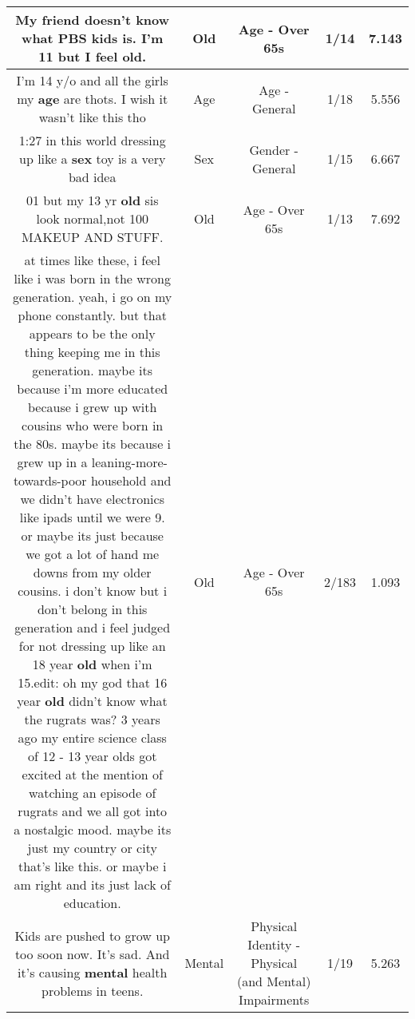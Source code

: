 \documentclass[11pt]{article}
\newlength\mylength
\begin{document}
\begin{center}
\begin{longtable}{|C{.65\mylength}|C{.30\mylength}|C{.12\mylength}|C{.12\mylength}|C{.12\mylength}|}
  \small My friend doesn't know what PBS kids is. I'm 11 but I feel \textbf{old}.\normalsize   & Old & Age - Over 65s & 1/14 & 7.143 \\  \hline
  \small I'm 14 y/o and all the girls my \textbf{age} are thots. I wish it wasn't like this tho\normalsize   & Age & Age - General & 1/18 & 5.556 \\  \hline
  \small 1:27 in this world dressing up like a \textbf{sex} toy is a very bad idea\normalsize   & Sex & Gender - General & 1/15 & 6.667 \\  \hline
  \small 01 but my 13 yr \textbf{old} sis look normal,not 100 MAKEUP AND STUFF.\normalsize   & Old & Age - Over 65s & 1/13 & 7.692 \\  \hline
  \small at times like these, i feel like i was born in the wrong generation. yeah, i go on my phone constantly. but that appears to be the only thing keeping me in this generation. maybe its because i'm more educated because i grew up with cousins who were born in the 80s. maybe its because i grew up in a leaning-more-towards-poor household and we didn't have electronics like ipads until we were 9. or maybe its just because we got a lot of hand me downs from my older cousins. i don't know but i don't belong in this generation and i feel judged for not dressing up like an 18 year \textbf{old} when i'm 15.edit: oh my god that 16 year \textbf{old} didn't know what the rugrats was? 3 years ago my entire science class of 12 - 13 year olds got excited at the mention of watching an episode of rugrats and we all got into a nostalgic mood. maybe its just my country or city that's like this. or maybe i am right and its just lack of education.\normalsize   & Old & Age - Over 65s & 2/183 & 1.093 \\  \hline
  \small Kids are pushed to grow up too soon now. It's sad. And it's causing \textbf{mental} health problems in teens.\normalsize   & Mental & Physical Identity - Physical (and Mental) Impairments & 1/19 & 5.263 \\  \hline

\end{longtable}
\end{center}
\end{document}
